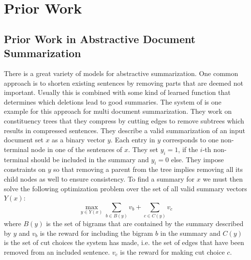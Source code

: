 \documentclass[a4paper,BCOR=10mm]{report}
\numberwithin{lemma}{chapter}
\numberwithin{definition}{chapter}
\begin{document}


\chapter{Prior Work} \label{sec:prior-work} 

\section{Prior Work in Abstractive Document Summarization} \label{sec:prior-work-mds} 

There is a great variety of models for abstractive summarization. One common approach is to shorten existing sentences by removing parts that are deemed not important. Usually this is combined with some kind of learned function that determines which deletions lead to good summaries.
The system of \citet{berg-kirkpatrick} is one example for this approach for multi document summarization. They work on constituency trees that they compress by cutting edges to remove subtrees which results in compressed sentences.
They describe a valid summarization of an input document set $x$ as a binary vector $y$. Each entry in $y$ corresponds to one non-terminal node in one of the sentences of $x$. They set $y_i = 1$, if the $i$-th non-terminal should be included in the summary and $y_i = 0$ else. They impose constraints on $y$ so that removing a parent from the tree implies removing all its child nodes as well to ensure consistency.
To find a summary for $x$ we must then solve the following optimization problem over the set of all valid summary vectors $Y(x)$:
\begin{equation}
\max_{y \in Y(x)} \sum_{b \in B(y)} v_b + \sum_{c \in C(y)} v_c
\end{equation}
where $B(y)$ is the set of bigrams that are contained by the summary described by $y$ and $v_b$ is the reward for including the bigram $b$ in the summary and $C(y)$ is the set of cut choices the system has made, i.e. the set of edges that have been removed from an included sentence. $v_c$ is the reward for making cut choice $c$.
\end{document}
